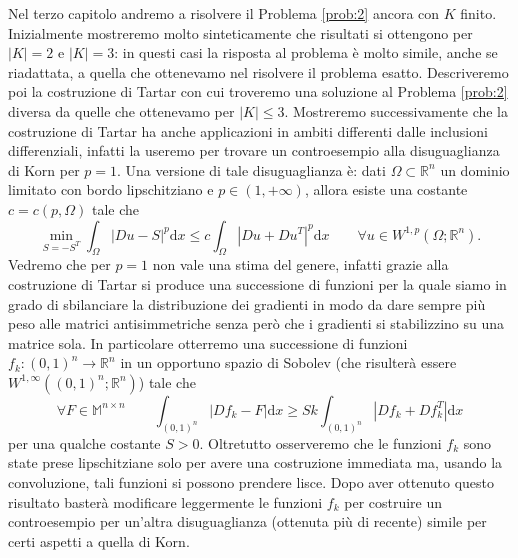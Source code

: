 \documentclass[a4paper,11pt]{book}
\theoremstyle{plain}
\theoremstyle{definition}
\theoremstyle{remark}
\newcommand{\R}{\mathbb{R}}
\newcommand{\M}{\mathbb{M}}
\newcommand{\dx}{\text{d}x}
\begin{document}
Nel terzo capitolo andremo a risolvere il Problema \ref{prob:2} ancora con $K$ finito. Inizialmente mostreremo molto sinteticamente che risultati si ottengono per $|K|=2$ e $|K|=3$: in questi casi la risposta al problema è molto simile, anche se riadattata, a quella che ottenevamo nel risolvere il problema esatto. Descriveremo poi la costruzione di Tartar con cui troveremo una soluzione al Problema \ref{prob:2} diversa da quelle che ottenevamo per $|K|\leq3$. Mostreremo successivamente che la costruzione di Tartar ha anche applicazioni in ambiti differenti dalle inclusioni differenziali, infatti la useremo per trovare un controesempio alla disuguaglianza di Korn per $p=1$. Una versione di tale disuguaglianza è: dati $\Omega\subset\R^{n}$ un dominio limitato con bordo lipschitziano e $p\in(1,+\infty)$, allora esiste una costante $c=c(p,\Omega)$ tale che
\[
	\min_{S=-S^T} \int_{\Omega}|Du-S|^p\dx\leq c\int_{\Omega}\left|Du+Du^T \right|^p\dx\qquad\forall u\in W^{1,p}(\Omega;\R^n).
\]
Vedremo che per $p=1$ non vale una stima del genere, infatti grazie alla costruzione di Tartar si produce una successione di funzioni per la quale siamo in grado di sbilanciare la distribuzione dei gradienti in modo da dare sempre più peso alle matrici antisimmetriche senza però che i gradienti si stabilizzino su una matrice sola. In particolare otterremo una successione di funzioni $f_{k}:(0,1)^{n}\to\R^{n}$ in un opportuno spazio di Sobolev (che risulterà essere $W^{1,\infty}((0,1)^n;\R^n)$) tale che
\[
	\forall F\in \M^{n\times n}\qquad\int_{(0,1)^n}|Df_k-F|\dx\geq Sk\int_{(0,1)^n}|Df_k+Df_k^T|\dx
\]
per una qualche costante $S>0$. Oltretutto osserveremo che le funzioni $f_{k}$ sono state prese lipschitziane solo per avere una costruzione immediata ma, usando la convoluzione, tali funzioni si possono prendere lisce. Dopo aver ottenuto questo risultato basterà modificare leggermente le funzioni $f_{k}$ per costruire un controesempio per un'altra disuguaglianza (ottenuta più di recente) simile per certi aspetti a quella di Korn.
\end{document}
